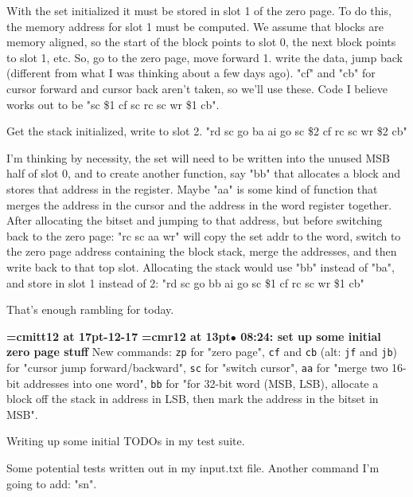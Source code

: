 With the set initialized it must be stored in slot 1 of  the zero page. To do this, the memory address for slot 1 must be computed. We assume that blocks are memory aligned, so the start of the block points to slot 0, the next block points to slot 1, etc. So, go to the zero page, move forward 1. write the data, jump back (different from what I was thinking about a few days ago). "cf" and "cb" for cursor forward and cursor back aren't taken, so we'll use these. Code I believe works out to be "sc \$1 cf sc rc sc wr \$1 cb".
\par

Get the stack initialized, write to slot 2. "rd sc go ba ai go sc \$2 cf rc sc wr \$2 cb"
\par

I'm thinking by necessity, the set will need to be written into the unused MSB half of slot 0, and to create another function, say "bb" that allocates a block and stores that address in the register. Maybe "aa" is some kind of function that merges the address in the cursor and the address in the word register together. After allocating the bitset and jumping to that address, but before switching back to the zero page: "rc sc aa wr" will copy the set addr to the word, switch to the zero page address containing the block stack, merge the addresses, and then write back to that top slot. Allocating the stack would use "bb" instead of "ba", and store in slot 1 instead of 2: "rd sc go bb ai go sc \$1 cf rc sc wr \$1 cb"
\par

That's enough rambling for today.
\par

{\medskip\noindent\bf\font\titlefont=cmitt12 at 17pt-12-17}\medskip
{\smallskip\noindent\bf\font\titlefont=cmr12 at 13pt\titlefont $\bullet$ 08:24: set up some initial zero page stuff}\smallskip
New commands: {\tt zp} for "zero page", {\tt cf} and {\tt cb} (alt: {\tt jf} and {\tt jb}) for "cursor jump forward/backward", {\tt sc} for "switch cursor", {\tt aa} for "merge two 16-bit addresses into one word", {\tt bb} for "for 32-bit word (MSB, LSB), allocate a block off the stack in address in LSB, then mark the address in the bitset in MSB".
\par

Writing up some initial TODOs in my test suite.
\par

Some potential tests written out in my input.txt file. Another command I'm going to add: "sn".
\par

